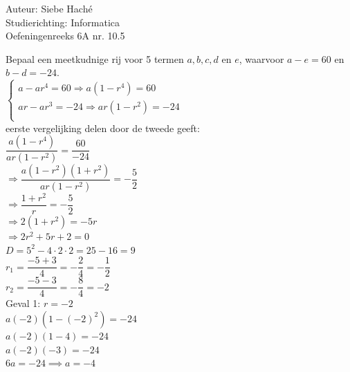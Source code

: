 \documentclass[a4paper]{article}
\begin{document}
\noindent \large Auteur: Siebe Haché \\
\noindent \large Studierichting: Informatica \\
\noindent \large Oefeningenreeks 6A nr. 10.5 \\

\medskip
\normalsize

Bepaal een meetkudnige rij voor 5 termen $a, b, c, d$ en $e$, waarvoor $a - e = 60$ en $b - d = -24$.\\

$\left\{ \begin{array}{l} 
    a - ar^4 = 60 \Rightarrow a(1 - r^4) = 60\\

    ar - ar^3 = -24 \Rightarrow ar(1 - r^2) = -24\\
\end{array} \right. $ \\

eerste vergelijking delen door de tweede geeft: \\

$\dfrac{a(1 - r^4)}{ar(1 - r^2)} = \dfrac{60}{-24}$ \\

$\Rightarrow\dfrac{a(1 - r^2)(1 + r^2)}{ar(1 - r^2)} = -\dfrac{5}{2}$\\

$\Rightarrow\dfrac{1 + r^2}{r} = -\dfrac{5}{2}$ \\

$\Rightarrow 2(1 + r^2) = -5r$ \\

$\Rightarrow 2r^2 + 5r + 2 = 0$ \\

$D = 5^2 - 4 \cdot 2 \cdot 2 = 25 - 16 = 9$ \\

$r_{1} = \dfrac{-5 + 3}{4} = -\dfrac{2}{4} = -\dfrac{1}{2}$ \\

$r_{2} = \dfrac{-5 - 3}{4} = -\dfrac{8}{4} = -2$ \\

Geval 1: $r = -2$ \\

$a(-2)(1 - (-2)^2) = -24$ \\

$a(-2)(1 - 4) = -24$ \\

$a(-2)(-3) = -24$ \\

$6a = -24 \implies a = -4$ \\
\end{document}

